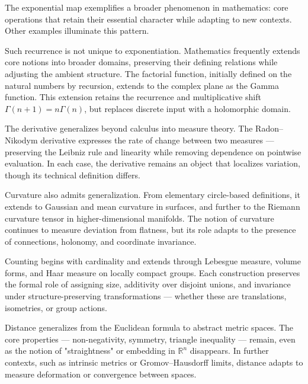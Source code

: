 \begin{commentary}[Generalizations]
The exponential map exemplifies a broader phenomenon in mathematics: core operations that retain their essential character while adapting to new contexts. Other examples illuminate this pattern.

Such recurrence is not unique to exponentiation. Mathematics frequently extends core notions into broader domains, preserving their defining relations while adjusting the ambient structure. The factorial function, initially defined on the natural numbers by recursion, extends to the complex plane as the Gamma function. This extension retains the recurrence and multiplicative shift \( \Gamma(n+1) = n\Gamma(n) \), but replaces discrete input with a holomorphic domain.

The derivative generalizes beyond calculus into measure theory. The Radon–Nikodym derivative expresses the rate of change between two measures — preserving the Leibniz rule and linearity while removing dependence on pointwise evaluation. In each case, the derivative remains an object that localizes variation, though its technical definition differs.

Curvature also admits generalization. From elementary circle-based definitions, it extends to Gaussian and mean curvature in surfaces, and further to the Riemann curvature tensor in higher-dimensional manifolds. The notion of curvature continues to measure deviation from flatness, but its role adapts to the presence of connections, holonomy, and coordinate invariance.

Counting begins with cardinality and extends through Lebesgue measure, volume forms, and Haar measure on locally compact groups. Each construction preserves the formal role of assigning size, additivity over disjoint unions, and invariance under structure-preserving transformations — whether these are translations, isometries, or group actions.

Distance generalizes from the Euclidean formula to abstract metric spaces. The core properties — non-negativity, symmetry, triangle inequality — remain, even as the notion of "straightness" or embedding in $\mathbb{R}^n$ disappears. In further contexts, such as intrinsic metrics or Gromov–Hausdorff limits, distance adapts to measure deformation or convergence between spaces.


\end{commentary}
